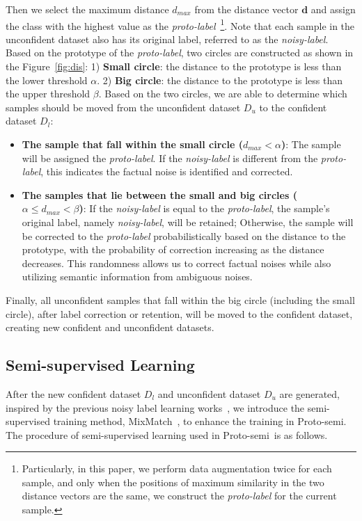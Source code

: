 \documentclass[letterpaper]{article} %
\newcommand{\method}{Proto-semi}
\begin{document}
Then we select the maximum distance $d_{max}$ from the distance vector $\bm{d}$ and assign the class with the highest value as the \textit{proto-label}~\footnote{Particularly, in this paper, we perform data augmentation twice for each sample, and only when the positions of maximum similarity in the two distance vectors are the same, we construct the \textit{proto-label} for the current sample.}. Note that each sample in the unconfident dataset also has its original label, referred to as the \textit{noisy-label}. Based on the prototype of the \textit{proto-label}, two circles are constructed as shown in the Figure~\ref{fig:dis}: 1) \textbf{Small circle}: the distance to the prototype is less than the lower threshold $\alpha$. 2) \textbf{Big circle}: the distance to the prototype is less than the upper threshold $\beta$. Based on the two circles, we are able to determine which samples should be moved from the unconfident dataset $D_u$ to the confident dataset $D_l$:
\begin{itemize}
    \item \textbf{The sample that fall within the small circle ($d_{max} < \alpha$)}: The sample will be assigned the \textit{proto-label}. If the \textit{noisy-label} is different from the \textit{proto-label}, this indicates the factual noise is identified and corrected.
    \item \textbf{The samples that lie between the small and big circles ( $\alpha
    \leq d_{max} < \beta$)}: If the \textit{noisy-label} is equal to the \textit{proto-label}, the sample's original label, namely \textit{noisy-label}, will be retained; Otherwise, the sample will be corrected to the  \textit{proto-label} probabilistically based on the distance to the prototype, with the probability of correction increasing as the distance decreases. This randomness allows us to correct factual noises while also utilizing semantic information from ambiguous noises.
\end{itemize}



Finally, all unconfident samples that fall within the big circle (including the small circle), after label correction or retention, will be moved to the confident dataset, creating new confident and unconfident datasets.

\subsection{Semi-supervised Learning}
After the new confident dataset $D_l$ and unconfident dataset $D_u$ are generated, inspired by the previous noisy label learning works~\cite{DBLP:journals/corr/abs-2303-10802, DBLP:journals/corr/abs-2007-08199, DBLP:conf/iclr/WeiZ0L0022}, we introduce the semi-supervised training method, MixMatch~\cite{DBLP:conf/nips/BerthelotCGPOR19}, to enhance the training in \method.
The procedure of semi-supervised learning used in \method\ is as follows.
\end{document}
